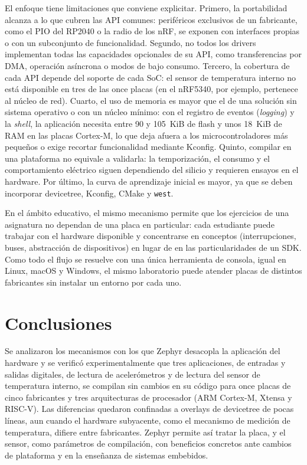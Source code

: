 El enfoque tiene limitaciones que conviene explicitar. Primero, la portabilidad alcanza a lo que cubren las API comunes: periféricos exclusivos de un fabricante, como el PIO del RP2040 o la radio de los nRF, se exponen con interfaces propias o con un subconjunto de funcionalidad. Segundo, no todos los drivers implementan todas las capacidades opcionales de su API, como transferencias por DMA, operación asíncrona o modos de bajo consumo. Tercero, la cobertura de cada API depende del soporte de cada SoC: el sensor de temperatura interno no está disponible en tres de las once placas (en el nRF5340, por ejemplo, pertenece al núcleo de red). Cuarto, el uso de memoria es mayor que el de una solución sin sistema operativo o con un núcleo mínimo: con el registro de eventos (\emph{logging}) y la \emph{shell}, la aplicación necesita entre 90 y 105~KiB de flash y unos 18~KiB de RAM en las placas Cortex-M, lo que deja afuera a los microcontroladores más pequeños o exige recortar funcionalidad mediante Kconfig. Quinto, compilar en una plataforma no equivale a validarla: la temporización, el consumo y el comportamiento eléctrico siguen dependiendo del silicio y requieren ensayos en el hardware. Por último, la curva de aprendizaje inicial es mayor, ya que se deben incorporar devicetree, Kconfig, CMake y \texttt{west}.

En el ámbito educativo, el mismo mecanismo permite que los ejercicios de una asignatura no dependan de una placa en particular: cada estudiante puede trabajar con el hardware disponible y concentrarse en conceptos (interrupciones, buses, abstracción de dispositivos) en lugar de en las particularidades de un SDK. Como todo el flujo se resuelve con una única herramienta de consola, igual en Linux, macOS y Windows, el mismo laboratorio puede atender placas de distintos fabricantes sin instalar un entorno por cada uno.

\section{Conclusiones}

Se analizaron los mecanismos con los que Zephyr desacopla la aplicación del hardware y se verificó experimentalmente que tres aplicaciones, de entradas y salidas digitales, de lectura de acelerómetros y de lectura del sensor de temperatura interno, se compilan sin cambios en su código para once placas de cinco fabricantes y tres arquitecturas de procesador (ARM Cortex-M, Xtensa y RISC-V). Las diferencias quedaron confinadas a overlays de devicetree de pocas líneas, aun cuando el hardware subyacente, como el mecanismo de medición de temperatura, difiere entre fabricantes. Zephyr permite así tratar la placa, y el sensor, como parámetros de compilación, con beneficios concretos ante cambios de plataforma y en la enseñanza de sistemas embebidos.

